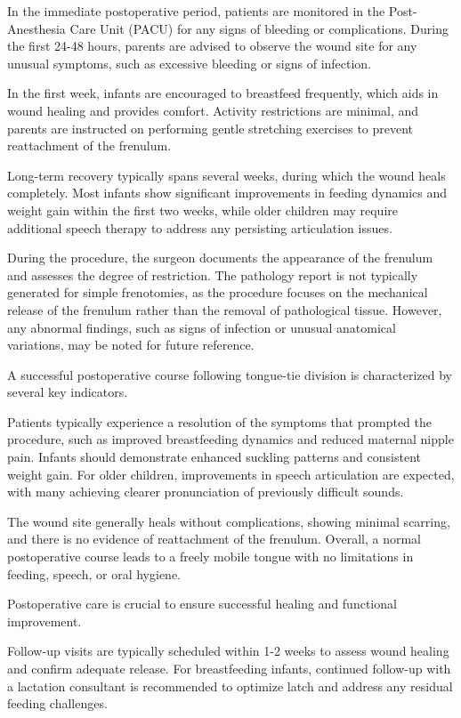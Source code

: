 In the immediate postoperative period, patients are monitored in the Post-Anesthesia Care Unit (PACU) for any signs of bleeding or complications. During the first 24-48 hours, parents are advised to observe the wound site for any unusual symptoms, such as excessive bleeding or signs of infection. 

In the first week, infants are encouraged to breastfeed frequently, which aids in wound healing and provides comfort. Activity restrictions are minimal, and parents are instructed on performing gentle stretching exercises to prevent reattachment of the frenulum. 

Long-term recovery typically spans several weeks, during which the wound heals completely. Most infants show significant improvements in feeding dynamics and weight gain within the first two weeks, while older children may require additional speech therapy to address any persisting articulation issues.

During the procedure, the surgeon documents the appearance of the frenulum and assesses the degree of restriction. The pathology report is not typically generated for simple frenotomies, as the procedure focuses on the mechanical release of the frenulum rather than the removal of pathological tissue. However, any abnormal findings, such as signs of infection or unusual anatomical variations, may be noted for future reference.

A successful postoperative course following tongue-tie division is characterized by several key indicators. 

Patients typically experience a resolution of the symptoms that prompted the procedure, such as improved breastfeeding dynamics and reduced maternal nipple pain. Infants should demonstrate enhanced suckling patterns and consistent weight gain. For older children, improvements in speech articulation are expected, with many achieving clearer pronunciation of previously difficult sounds. 

The wound site generally heals without complications, showing minimal scarring, and there is no evidence of reattachment of the frenulum. Overall, a normal postoperative course leads to a freely mobile tongue with no limitations in feeding, speech, or oral hygiene.

Postoperative care is crucial to ensure successful healing and functional improvement. 

Follow-up visits are typically scheduled within 1-2 weeks to assess wound healing and confirm adequate release. For breastfeeding infants, continued follow-up with a lactation consultant is recommended to optimize latch and address any residual feeding challenges. 

